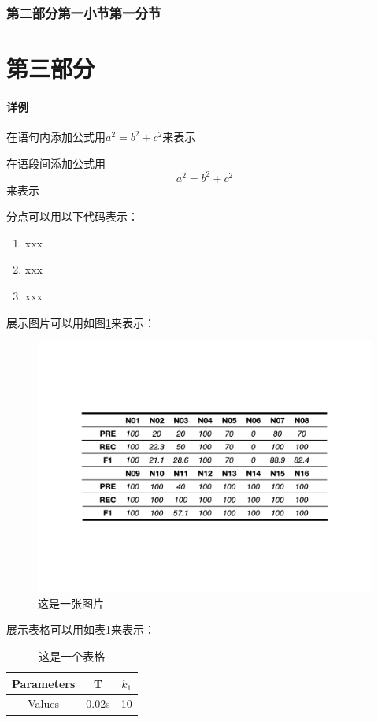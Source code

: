 \documentclass[12pt]{article}
\begin{document}
\subsubsection{\songti{}第二部分第一小节第一分节}
\section{\songti{}第三部分}
\paragraph{\songti{}详例}

\songti{}在语句内添加公式用$a^2=b^2+c^2$来表示

\songti{}在语段间添加公式用$$a^2=b^2+c^2$$来表示

\songti{}分点可以用以下代码表示：
\begin{enumerate}
    \songti{}\item xxx
    \songti{}\item xxx
    \songti{}\item xxx
\end{enumerate}

\songti{}展示图片可以用如图\ref{fig:图片}来表示：
\begin{figure}[H]
    \label{fig:图片}
    \centering
    \includegraphics[scale=0.5,trim=150 220 150 220,clip]{图片.jpeg}
    \caption{\fangsong 这是一张图片}
\end{figure}

\songti{}展示表格可以用如表\ref{tab:表格}来表示：
\begin{table}[H]
    \label{tab:表格}
    \centering
    \begin{tabular}{ccc}
        \hline
        Parameters & T & $k_1$ \\ 
        \hline
        Values & 0.02s & 10 \\ 
        \hline
    \end{tabular}
    \caption{\fangsong 这是一个表格}
\end{table}
\end{document}
